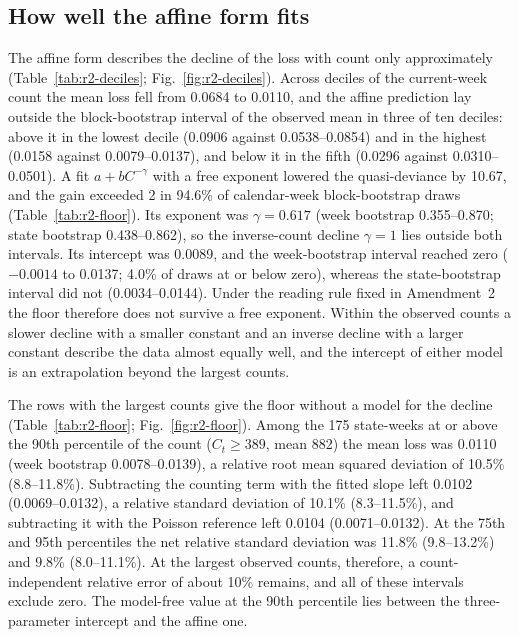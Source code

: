 \subsection{How well the affine form fits}
\label{sec:res-form}

The affine form describes the decline of the loss with count only approximately (Table~\ref{tab:r2-deciles}; Fig.~\ref{fig:r2-deciles}). Across deciles of the current-week count the mean loss fell from 0.0684 to 0.0110, and the affine prediction lay outside the block-bootstrap interval of the observed mean in three of ten deciles: above it in the lowest decile (0.0906 against 0.0538--0.0854) and in the highest (0.0158 against 0.0079--0.0137), and below it in the fifth (0.0296 against 0.0310--0.0501). A fit $a+bC^{-\gamma}$ with a free exponent lowered the quasi-deviance by 10.67, and the gain exceeded 2 in 94.6\% of calendar-week block-bootstrap draws (Table~\ref{tab:r2-floor}). Its exponent was $\gamma=0.617$ (week bootstrap 0.355--0.870; state bootstrap 0.438--0.862), so the inverse-count decline $\gamma=1$ lies outside both intervals. Its intercept was 0.0089, and the week-bootstrap interval reached zero ($-0.0014$ to 0.0137; 4.0\% of draws at or below zero), whereas the state-bootstrap interval did not (0.0034--0.0144). Under the reading rule fixed in Amendment~2 the floor therefore does not survive a free exponent. Within the observed counts a slower decline with a smaller constant and an inverse decline with a larger constant describe the data almost equally well, and the intercept of either model is an extrapolation beyond the largest counts.

The rows with the largest counts give the floor without a model for the decline (Table~\ref{tab:r2-floor}; Fig.~\ref{fig:r2-floor}). Among the 175 state-weeks at or above the 90th percentile of the count ($C_t\ge389$, mean 882) the mean loss was 0.0110 (week bootstrap 0.0078--0.0139), a relative root mean squared deviation of 10.5\% (8.8--11.8\%). Subtracting the counting term with the fitted slope left 0.0102 (0.0069--0.0132), a relative standard deviation of 10.1\% (8.3--11.5\%), and subtracting it with the Poisson reference left 0.0104 (0.0071--0.0132). At the 75th and 95th percentiles the net relative standard deviation was 11.8\% (9.8--13.2\%) and 9.8\% (8.0--11.1\%). At the largest observed counts, therefore, a count-independent relative error of about 10\% remains, and all of these intervals exclude zero. The model-free value at the 90th percentile lies between the three-parameter intercept and the affine one.

